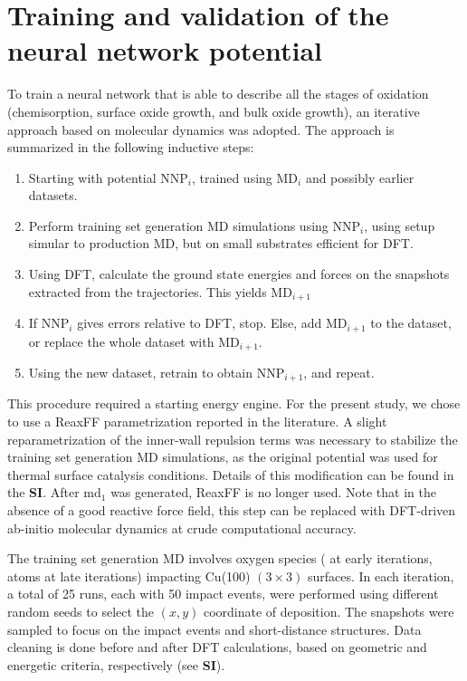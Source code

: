 \documentclass[manuscript=cmatex]{achemso}
\begin{document}
\section{Training and validation of the neural network potential}
To train a neural network that is able to describe all the stages of oxidation (chemisorption, surface oxide growth, and bulk oxide growth), an iterative approach based on molecular dynamics was adopted. The approach is summarized in the following inductive steps:
\begin{enumerate}
\item Starting with potential \textbf{$\mathrm{NNP}_i$}, trained using $\mathrm{MD}_i$ and possibly earlier datasets.
\item Perform training set generation MD simulations using \textbf{$\mathrm{NNP}_i$}, using setup simular to production MD, but on small substrates efficient for DFT. 
\item Using DFT, calculate the ground state energies and forces on the snapshots extracted from the trajectories. This yields $\mathrm{MD}_{i+1}$
\item If \textbf{$\mathrm{NNP}_i$} gives errors relative to DFT, stop. Else, add $\mathrm{MD}_{i+1}$ to the dataset, or replace the whole dataset with $\mathrm{MD}_{i+1}$.
\item Using the new dataset, retrain to obtain \textbf{$\mathrm{NNP}_{i+1}$}, and repeat.
\end{enumerate}
This procedure required a starting energy engine. For the present study, we chose to use a ReaxFF parametrization reported in the literature\cite{zhu_development_2020}. A slight reparametrization of the inner-wall repulsion terms was necessary to stabilize the training set generation MD simulations, as the original potential was used for thermal surface catalysis conditions. Details of this modification can be found in the \textbf{SI}. After $\mathrm{md}_1$ was generated, ReaxFF is no longer used. Note that in the absence of a good reactive force field, this step can be replaced with DFT-driven ab-initio molecular dynamics at crude computational accuracy.

The training set generation MD involves oxygen species ( at early iterations,  atoms at late iterations) impacting Cu(100) $(3\times3)$ surfaces. In each iteration, a total of 25 runs, each with 50 impact events, were performed using different random seeds to select the $(x, y)$ coordinate of  deposition. The snapshots were sampled to focus on the impact events and short-distance structures. Data cleaning is done before and after DFT calculations, based on geometric and energetic criteria, respectively (see \textbf{SI}). 
\end{document}
